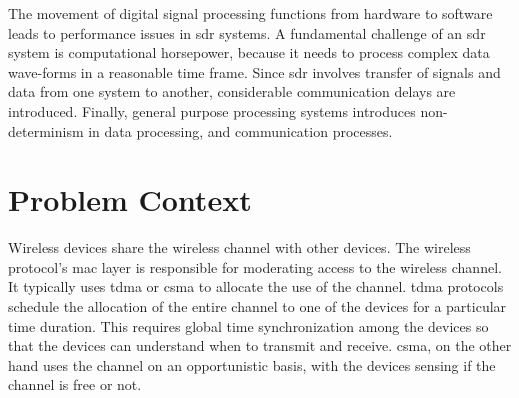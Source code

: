 
The movement of digital signal processing functions from hardware to software leads to performance issues in \ac{sdr} systems.
A fundamental challenge of an \ac{sdr} system is computational horsepower, because it needs to process complex data wave-forms in a reasonable time frame. Since \ac{sdr} involves transfer of signals and data from one system to another, considerable communication delays are introduced. Finally, general purpose processing systems introduces non-determinism in data processing, and communication processes.\\


\section{Problem Context}
Wireless devices share the wireless channel with other devices. The wireless protocol's \ac{mac} layer is responsible for moderating access to the wireless channel. It typically uses \ac{tdma} or \ac{csma} to allocate the use of the channel. \ac{tdma} protocols schedule the allocation of the entire channel to one of the devices for a particular time duration. This requires global time synchronization among the devices so that the devices can understand when to transmit and receive. \ac{csma}, on the other hand uses the channel on an opportunistic basis, with the devices sensing if the channel is free or not.\\

